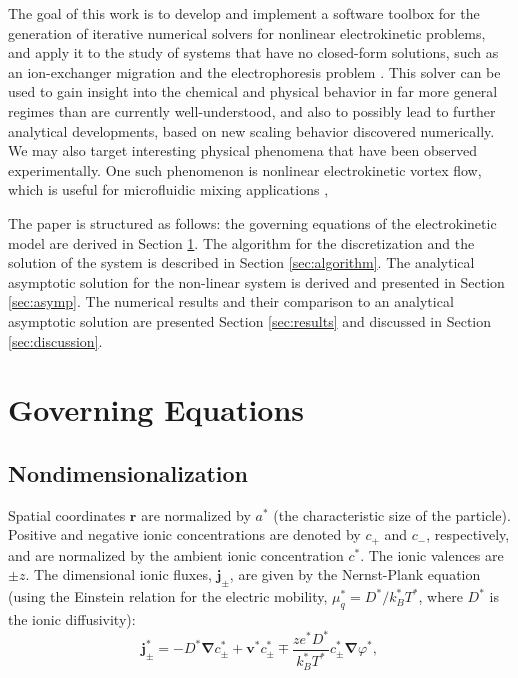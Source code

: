 \documentclass[10pt]{ijnam}
\newcommand\bnabla{\boldsymbol{\nabla}}
\newcommand\bv{\boldsymbol{v}}
\newcommand\bj{\boldsymbol{j}}
\newcommand\br{\boldsymbol{r}}
\begin{document}
The goal of this work is to develop and implement a software toolbox for the generation
of iterative numerical solvers for nonlinear electrokinetic problems, and apply it to the study
of systems that have no closed-form solutions, such as an ion-exchanger migration
\cite{yariv2010migration} and the electrophoresis problem \cite{schnitzer2012surface}.
This solver can be used to gain insight into the chemical and physical behavior 
in far more general regimes than are currently well-understood, 
and also to possibly lead to further analytical developments, based on new scaling behavior
discovered numerically. We may also target interesting physical
phenomena that have been observed experimentally.
One such phenomenon is nonlinear electrokinetic vortex flow, 
which is useful for microfluidic mixing applications \cite{wang2004mix, ben2002vortex},

The paper is structured as follows: the governing equations of the electrokinetic model
are derived in Section \ref{sec:equations}. The algorithm for the discretization and 
the solution of the system is described in Section \ref{sec:algorithm}.
The analytical asymptotic solution for the non-linear system is derived 
and presented in Section \ref{sec:asymp}.
The numerical results and their comparison to an analytical asymptotic solution 
are presented Section \ref{sec:results} and discussed in Section \ref{sec:discussion}. 

\section{Governing Equations} \label{sec:equations}

\subsection{Nondimensionalization}
Spatial coordinates $\br$ are normalized by $a^*$ 
(the characteristic size of the particle).
Positive and negative ionic concentrations are denoted by $c_+$ and $c_-$, respectively, and
are normalized by the ambient ionic concentration $c^*$. The ionic valences are $\pm z$.
The dimensional ionic fluxes, $\bj_\pm$, are given by the Nernst-Plank equation 
(using the Einstein relation for the electric mobility, $\mu_q^* = D^* / k_B^* T^*$, 
where $D^*$ is the ionic diffusivity):
\begin{equation}
\bj^*_\pm = 
-D^* \bnabla c^*_\pm + \bv^* c^*_\pm \mp \frac{z e^* D^*}{k_B^* T^*} c^*_\pm \bnabla \varphi^*,
\end{equation}
\end{document}
